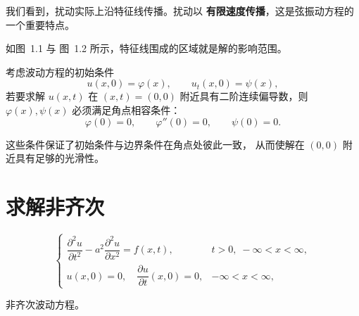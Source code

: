 我们看到，扰动实际上沿特征线传播。扰动以 \textbf{有限速度传播}，这是弦振动方程的一个重要特点。

如图~1.1 与 图~1.2 所示，特征线围成的区域就是解的影响范围。

\begin{theorem}[相容条件]
考虑波动方程的初始条件
\[
u(x,0)=\varphi(x), \qquad u_t(x,0)=\psi(x),
\]
若要求解 $u(x,t)$ 在 $(x,t)=(0,0)$ 附近具有二阶连续偏导数，则
$\varphi(x),\psi(x)$ 必须满足角点相容条件：
\[
\varphi(0)=0,\qquad \varphi''(0)=0,\qquad \psi(0)=0.
\]
\end{theorem}

\begin{remark}
这些条件保证了初始条件与边界条件在角点处彼此一致，
从而使解在 $(0,0)$ 附近具有足够的光滑性。
\end{remark}
\section{求解非齐次}
\[
\begin{cases}
\dfrac{\partial^2 u}{\partial t^2} - a^2 \dfrac{\partial^2 u}{\partial x^2} = f(x,t), 
& t>0,\; -\infty<x<\infty, \tag{2.9}\\[1.2em]
u(x,0)=0,\quad \dfrac{\partial u}{\partial t}(x,0)=0, 
& -\infty<x<\infty, 
\end{cases}
\]

非齐次波动方程。

\medskip

